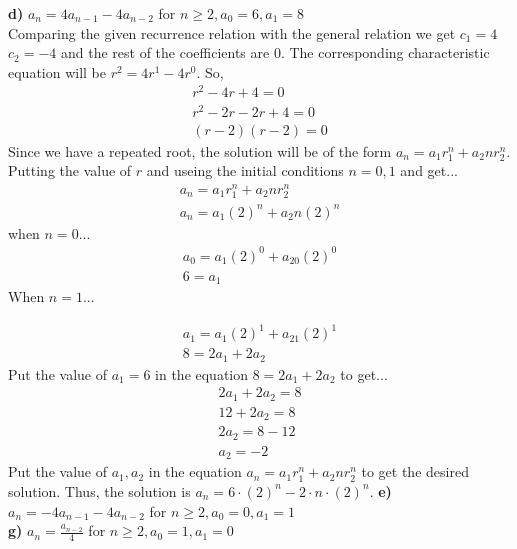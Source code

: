 \documentclass[12pt]{article}
\begin{document}
    \textbf{d)} $ a_n=4a_{n-1} - 4a_{n-2} $ for $ n \geq 2, a_0=6, a_1=8 $\\
    Comparing the given recurrence relation with the general relation we get $c_1=4$ $c_2=-4$ and the rest of the coefficients are 0.
    The corresponding characteristic equation will be $r^2=4r^1-4r^0$. So,
    \begin{equation}
        \begin{split}
            r^2-4r+4=0\\
            r^2-2r-2r+4=0\\
            (r-2)(r-2)=0
        \end{split}
    \end{equation}
    Since we have a repeated root, the solution will be of the form $a_n=a_1r_1^n+a_2nr_2^n$.
    Putting the value of $r$ and useing the initial conditions $n=0,1$ and get...
    \begin{equation}
        \begin{split}
            a_n=a_1r_1^n+a_2nr_2^n\\
            a_n=a_1(2)^n+a_2n(2)^n
        \end{split}
    \end{equation}
    when $n=0$...
    \begin{equation}
        \begin{split}
            a_0=a_1(2)^0+a_20(2)^0\\
            6=a_1
        \end{split}
    \end{equation}
When $n=1$...
    
\begin{equation}
    \begin{split}
        a_1=a_1(2)^1+a_21(2)^1\\
        8=2a_1+2a_2
    \end{split}
\end{equation}
Put the value of $a_1=6$ in the equation $8=2a_1+2a_2$ to get...
\begin{equation}
    \begin{split}
        2a_1+2a_2=8\\
        12+2a_2=8\\
        2a_2=8-12\\
        a_2=-2
    \end{split}
\end{equation}
Put the value of $a_1,a_2$ in the equation $a_n=a_1r_1^n+a_2nr_2^n$ to get the desired solution.
Thus, the solution is $a_n=6\cdot (2)^n-2\cdot n \cdot (2)^n$.
    \textbf{e)} $ a_n=-4a_{n-1} - 4a_{n-2} $ for $ n \geq 2, a_0=0, a_1=1 $\\
    \textbf{g)} $ a_n=\frac{a_{n-2}}{4} $ for $ n \geq 2, a_0=1, a_1=0 $
\end{document}
